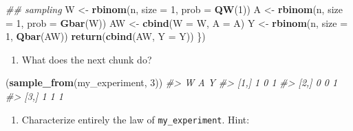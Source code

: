\documentclass[11pt,openright,twoside]{book}
\newenvironment{Shaded}{\begin{snugshade}}{\end{snugshade}}
\newcommand{\CommentTok}[1]{\textcolor[rgb]{0.56,0.35,0.01}{\textit{#1}}}
\newcommand{\DataTypeTok}[1]{\textcolor[rgb]{0.13,0.29,0.53}{#1}}
\newcommand{\DecValTok}[1]{\textcolor[rgb]{0.00,0.00,0.81}{#1}}
\newcommand{\KeywordTok}[1]{\textcolor[rgb]{0.13,0.29,0.53}{\textbf{#1}}}
\newcommand{\NormalTok}[1]{#1}
\newcommand{\StringTok}[1]{\textcolor[rgb]{0.31,0.60,0.02}{#1}}
\providecommand{\tightlist}{%
  \setlength{\itemsep}{0pt}\setlength{\parskip}{0pt}}
\theoremstyle{definition}
\theoremstyle{definition}
\theoremstyle{definition}
\theoremstyle{remark}
\begin{document}
\begin{Shaded}
\begin{Highlighting}[]
        \CommentTok{## sampling}
\NormalTok{        W <-}\StringTok{ }\KeywordTok{rbinom}\NormalTok{(n, }\DataTypeTok{size =} \DecValTok{1}\NormalTok{, }\DataTypeTok{prob =} \KeywordTok{QW}\NormalTok{(}\DecValTok{1}\NormalTok{))}
\NormalTok{        A <-}\StringTok{ }\KeywordTok{rbinom}\NormalTok{(n, }\DataTypeTok{size =} \DecValTok{1}\NormalTok{, }\DataTypeTok{prob =} \KeywordTok{Gbar}\NormalTok{(W))}
\NormalTok{        AW <-}\StringTok{ }\KeywordTok{cbind}\NormalTok{(}\DataTypeTok{W =}\NormalTok{ W, }\DataTypeTok{A =}\NormalTok{ A)}
\NormalTok{        Y <-}\StringTok{ }\KeywordTok{rbinom}\NormalTok{(n, }\DataTypeTok{size =} \DecValTok{1}\NormalTok{, }\KeywordTok{Qbar}\NormalTok{(AW))}
        \KeywordTok{return}\NormalTok{(}\KeywordTok{cbind}\NormalTok{(AW, }\DataTypeTok{Y =}\NormalTok{ Y))}
\NormalTok{      \})}
\end{Highlighting}
\end{Shaded}

\begin{enumerate}
\def\labelenumi{\arabic{enumi}.}
\setcounter{enumi}{2}
\tightlist
\item
  What does the next chunk do?
\end{enumerate}

\begin{Shaded}
\begin{Highlighting}[]
\NormalTok{(}\KeywordTok{sample_from}\NormalTok{(my_experiment, }\DecValTok{3}\NormalTok{))}
\CommentTok{#>      W A Y}
\CommentTok{#> [1,] 1 0 1}
\CommentTok{#> [2,] 0 0 1}
\CommentTok{#> [3,] 1 1 1}
\end{Highlighting}
\end{Shaded}

\begin{enumerate}
\def\labelenumi{\arabic{enumi}.}
\setcounter{enumi}{3}
\tightlist
\item
  Characterize entirely the law of \texttt{my\_experiment}. Hint:
\end{enumerate}
\end{document}
